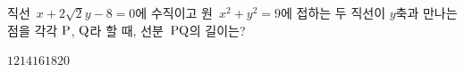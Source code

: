 직선~$x+2\sqrt{2}y-8=0$에 수직이고 원~$x^2+y^2=9$에 접하는 두 직선이 $y$축과 만나는 점을 각각 $\mathrm{P}$, $\mathrm{Q}$라 할 때, 선분~$\mathrm{PQ}$의 길이는?
\begin{choices32}{$12$}{$14$}{$16$}{$18$}{$20$}\end{choices32}
